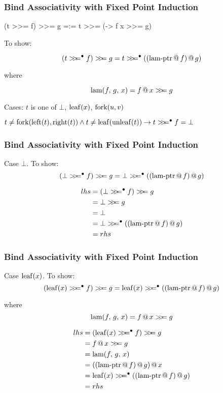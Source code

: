 \documentclass[serif,professionalfont]{beamer}
\begin{document}
\newcommand\lamptr[2]{(\appp{\app{\ptr{lam}}{#1}}{#2})}
\newcommand\lam[3]{\fn{lam}(#1, \, #2, \, #3)}

\begin{frame}[fragile]
\frametitle{Bind Associativity with Fixed Point Induction}

\begin{code}
(t >>= f) >>= g =:= t >>= (\x -> f x >>= g)
\end{code}


To show:

$$\bind{(\bindb{t}{f})}{g} = \bindb{t}{\lamptr{f}{g}}$$

where

$$\lam{f}{g}{x} = \bind{\app{f}{x}}{g}$$

\pause

\vspace{2\baselineskip}

Cases: $t$ is one of $\bot$, $\mathrm{leaf}(x)$, $\mathrm{fork}(u,v)$
\pause

\vspace{2\baselineskip}

$t \neq \mathrm{fork}(\mathrm{left}(t),\mathrm{right}(t)) \wedge t \neq\mathrm{leaf}(\mathrm{unleaf}(t)) \rightarrow t >\!\!>\!\!=^{\bullet} f = \bot$

\end{frame}

\begin{frame}[fragile]
\frametitle{Bind Associativity with Fixed Point Induction}

Case $\bot$. To show:
$$\bind{(\bindb{\bot}{f})}{g} = \bindb{\bot}{\lamptr{f}{g}}$$

\begin{align*}
lhs = & \; \bind{(\bindb{\bot}{f})}{g} \\
    = & \; \bind{\bot}{g}              \\
    = & \; \bot                        \\
    = & \; \bindb{\bot}{\lamptr{f}{g}} \\
    = & \; rhs
\end{align*}

\end{frame}

\begin{frame}[fragile]
\frametitle{Bind Associativity with Fixed Point Induction}

Case $\mathrm{leaf}(x)$. To show:
$$\bind{(\bindb{\leaf{x}}{f})}{g} = \bindb{\leaf{x}}{\lamptr{f}{g}}$$

where
$$\lam{f}{g}{x} = \bind{\app{f}{x}}{g}$$

\begin{align*}
lhs = & \; \bind{(\bindb{\leaf{x}}{f})}{g} \\
    = & \; \bind{\app{f}{x}}{g}            \\
    = & \; \lam{f}{g}{x}              \\
    = & \; \app{\lamptr{f}{g}}{x}          \\
    = & \; \bindb{\leaf{x}}{\lamptr{f}{g}} \\
    = & \; rhs
\end{align*}

\end{frame}
\end{document}
